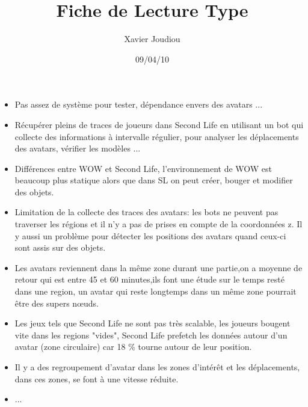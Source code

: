 \documentclass[11pt,a4paper]{article}
\title{Fiche de Lecture Type}
\author{Xavier Joudiou}
\date{09/04/10}
\begin{document}
	
  \begin{itemize}
  \renewcommand{\labelitemi}{$\Rightarrow$}
	\item Pas assez de système pour tester, dépendance envers des avatars ...
	\item Récupérer pleins de traces de joueurs dans Second Life en utilisant un bot qui collecte des informations à intervalle régulier, pour analyser les déplacements des avatars, vérifier les modèles ...
	\item Différences entre WOW et Second Life, l'environnement de WOW est beaucoup plus statique alors que dans SL on peut créer, bouger et modifier des objets.
	\item Limitation de la collecte des traces des avatars: les bots ne peuvent pas traverser les régions et il n'y a pas de prises en compte de la coordonnées z. Il y aussi un problème pour détecter les positions des avatars quand ceux-ci sont assis sur des objets.
	\item Les avatars reviennent dans la même zone durant une partie,on a moyenne de retour qui est entre 45 et 60 minutes,ils font une étude sur le temps resté dans une region, un avatar qui reste longtemps dans un même zone  pourrait être des supers nœuds.
	\item Les jeux tels que Second Life ne sont pas très scalable, les joueurs bougent vite dans les regions "vides", Second Life prefetch les données autour d'un avatar (zone circulaire) car 18 \% tourne autour de leur position.
	\item Il y a des regroupement d'avatar dans les zones d'intérêt et les déplacements, dans ces zones, se font à une vitesse réduite.
	\item ...
  \end{itemize}
\end{document}
